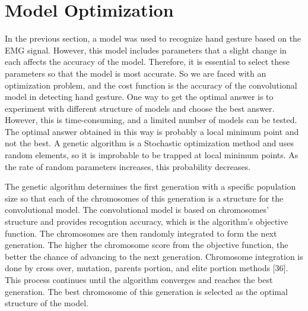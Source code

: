 \section{Model Optimization}
In the previous section, a model was used to recognize hand gesture based on the EMG signal. However, this model includes parameters that a slight change in each affects the accuracy of the model. Therefore, it is essential to select these parameters so that the model is most accurate. So we are faced with an optimization problem, and the cost function is the accuracy of the convolutional model in detecting hand gesture. One way to get the optimal answer is to experiment with different structure of models and choose the best answer. However, this is time-consuming, and a limited number of models can be tested. The optimal answer obtained in this way is probably a local minimum point and not the best. A genetic algorithm is a Stochastic optimization method and uses random elements, so it is improbable to be trapped at local minimum points. As the rate of random parameters increases, this probability decreases.

The genetic algorithm determines the first generation with a specific population size so that each of the chromosomes of this generation is a structure for the convolutional model. The convolutional model is based on chromosomes' structure and provides recogntion accuracy, which is the algorithm's objective function. The chromosomes are then randomly integrated to form the next generation. The higher the chromosome score from the objective function, the better the chance of advancing to the next generation. Chromosome integration is done by cross over, mutation, parents portion, and elite portion methods [36]. This process continues until the algorithm converges and reaches the best generation. The best chromosome of this generation is selected as the optimal structure of the model.

